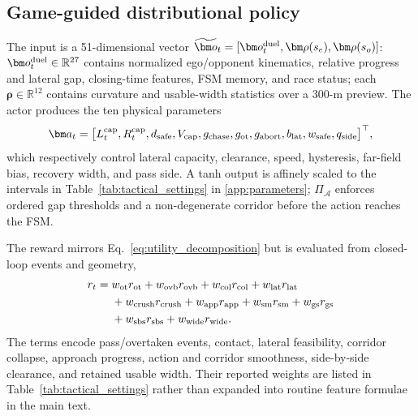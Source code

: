 \subsection{Game-guided distributional policy}
\label{subsec:theory_guided_rl}

The input is a 51-dimensional vector
$\widetilde{\bm o}_t=[\bm o_t^{\rm duel},\bm\rho(s_e),\bm\rho(s_o)]$:
$\bm o_t^{\rm duel}\in\mathbb R^{27}$ contains normalized ego/opponent
kinematics, relative progress and lateral gap, closing-time features, FSM
memory, and race status; each $\bm\rho\in\mathbb R^{12}$ contains curvature
and usable-width statistics over a 300-m preview.  The actor produces the
ten physical parameters
\begin{equation}
\bm a_t=\bigl[L_t^{\rm cap},R_t^{\rm cap},d_{\rm safe},V_{\rm cap},
g_{\rm chase},g_{\rm ot},g_{\rm abort},b_{\rm lat},w_{\rm safe},q_{\rm side}
\bigr]^\top,
\label{eq:action_vec}
\end{equation}
which respectively control lateral capacity, clearance, speed, hysteresis,
far-field bias, recovery width, and pass side.  A tanh output is affinely
scaled to the intervals in Table~\ref{tab:tactical_settings} in
\ref{app:parameters};
$\Pi_{\mathcal A}$ enforces ordered gap thresholds and a non-degenerate
corridor before the action reaches the FSM.

The reward mirrors Eq.~\eqref{eq:utility_decomposition} but is evaluated from
closed-loop events and geometry,
\begin{equation}
\begin{aligned}
r_t={}&w_{\rm ot}r_{\rm ot}+w_{\rm ovb}r_{\rm ovb}
      +w_{\rm col}r_{\rm col}+w_{\rm lat}r_{\rm lat}\\
&+w_{\rm crush}r_{\rm crush}+w_{\rm app}r_{\rm app}
      +w_{\rm sm}r_{\rm sm}+w_{\rm gs}r_{\rm gs}\\
&+w_{\rm sbs}r_{\rm sbs}+w_{\rm wide}r_{\rm wide}.
\end{aligned}
\label{eq:reward_sum}
\end{equation}
The terms encode pass/overtaken events, contact, lateral feasibility, corridor
collapse, approach progress, action and corridor smoothness, side-by-side
clearance, and retained usable width.  Their reported weights are listed in
Table~\ref{tab:tactical_settings} rather than expanded into routine feature
formulae in the main text.

